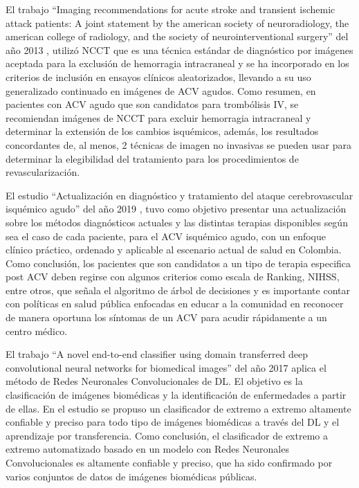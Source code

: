 \par El trabajo “Imaging recommendations for acute stroke and transient ischemic attack patients: A joint statement by the american society of neuroradiology, the american college of radiology, and the society of neurointerventional surgery” del año 2013 \cite{Wintermark2013}, utilizó NCCT que es una técnica estándar de diagnóstico por imágenes aceptada para la exclusión de hemorragia intracraneal y se ha incorporado en los criterios de inclusión en ensayos clínicos aleatorizados, llevando a su uso generalizado continuado en imágenes de ACV  agudos. Como resumen, en pacientes con ACV agudo que son candidatos para trombólisis IV, se recomiendan imágenes de NCCT para excluir hemorragia intracraneal y determinar la extensión de los cambios isquémicos, además, los resultados concordantes de, al menos, 2 técnicas de imagen no invasivas se pueden usar para determinar la elegibilidad del tratamiento para los procedimientos de revascularización.\\

\par El estudio “Actualización en diagnóstico y tratamiento del ataque cerebrovascular isquémico agudo” del año 2019 \cite{Garcia2019}, tuvo como objetivo presentar una actualización sobre los métodos diagnósticos actuales  y  las  distintas  terapias  disponibles según  sea  el  caso  de  cada  paciente,  para  el ACV isquémico agudo, con un enfoque clínico práctico, ordenado y aplicable al escenario actual de salud en Colombia. Como conclusión, los pacientes que son candidatos a un tipo de terapia especifica post ACV deben regirse con algunos criterios como escala de Ranking, NIHSS, entre otros, que señala el algoritmo de árbol de decisiones y es importante contar con políticas en salud pública enfocadas en educar a la comunidad en reconocer de manera oportuna los síntomas de un ACV para acudir rápidamente a un centro médico.\\

\par El trabajo “A novel end-to-end classifier using domain transferred deep convolutional neural networks for biomedical images” del año 2017 \cite{Pang2017} aplica el método de Redes Neuronales Convolucionales de DL. El objetivo es la clasificación de imágenes biomédicas y la identificación de enfermedades a partir de ellas. En el estudio se propuso un clasificador de extremo a extremo altamente confiable y preciso para todo tipo de imágenes biomédicas a través del DL y el aprendizaje por transferencia. Como conclusión, el clasificador de extremo a extremo automatizado basado en un modelo con Redes Neuronales Convolucionales es altamente confiable y preciso, que ha sido confirmado por varios conjuntos de datos de imágenes biomédicas públicas.\\

